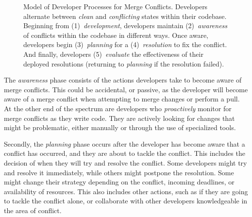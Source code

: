 
\begin{figure}[!htbp]
\centering
{}
\caption{Model of Developer Processes for Merge Conflicts. Developers alternate between \textit{clean} and \textit{conflicting} states within their codebase. Beginning from (1)~\textit{development}, developers maintain (2)~\textit{awareness} of conflicts within the codebase in different ways. Once aware, developers begin (3)~\textit{planning} for a (4)~\textit{resolution} to fix the conflict. And finally, developers (5)~\textit{evaluate} the effectiveness of their deployed resolutions (returning to \emph{planning} if the resolution failed).\vspace*{-0.3\baselineskip}}
\label{model}
\end{figure}

The \emph{awareness} phase consists of the actions developers take to become aware of merge conflicts.
This could be accidental, or passive, as the developer will become aware of a merge conflict when attempting to merge changes or perform a pull.
At the other end of the spectrum are developers who \emph{proactively} monitor for merge conflicts as they write code.
They are actively looking for changes that might be problematic, either manually or through the use of specialized tools.

Secondly, the \emph{planning} phase occurs after the developer has become aware that a conflict has occurred, and they are about to tackle the conflict.
This includes the decision of when they will try and resolve the conflict.
Some developers might try and resolve it immediately, while others might postpone the resolution.
Some might change their strategy depending on the conflict, incoming deadlines, or availability of resources.
This also includes other actions, such as if they are going to tackle the conflict alone, or collaborate with other developers knowledgeable in the area of conflict.

